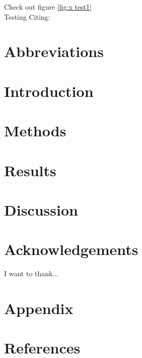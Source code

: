 \documentclass[10pt, openright,oneside]{book}
\begin{document}
Check out figure \ref{fig:x test1}\\


Testing Citing: \cite{einstein}

\listoffigures


\listoftables


\chapter*{Abbreviations}
%



\chapter{Introduction}
%

\chapter{Methods}
%

\chapter{Results}
%

\chapter{Discussion}
%


\chapter{Acknowledgements}
I want to thank...







\chapter*{Appendix}
\appendix
%


\backmatter
 
\chapter*{References}
\printbibliography
\end{document}
